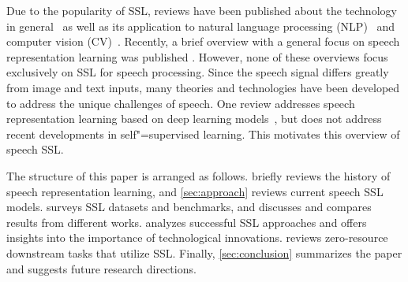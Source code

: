 Due to the popularity of SSL, reviews have been published about the
technology in general~\parencite{bommasani_opportunities_2021,ericsson_selfsupervised_2022,liu_selfsupervised_2021} as well as its application to natural language processing (NLP)~\parencite{rogers_primer_2020,liu_pretrain_2021,xia_which_2020,qiu_pretrained_2020} and computer vision (CV)~\parencite{jing_selfsupervised_2021}. Recently, a brief overview with a general focus on speech representation learning was published \parencite{borgholt_brief_2022}. 
However, none of these overviews focus exclusively on SSL for speech processing. Since the speech signal differs greatly from image and text inputs, many  theories  and technologies have been developed to address the unique challenges of speech. 
One review addresses speech representation learning based on deep learning models~\parencite{latif_deep_2021}, but does not address recent developments in self"=supervised learning. This motivates this overview of speech SSL.


The structure of this paper is arranged as follows. 
briefly reviews the history of speech representation learning, and
\cref{sec:approach} reviews current speech SSL models.
 surveys SSL datasets and benchmarks, 
and discusses and compares results from different works. 
analyzes successful SSL approaches and offers insights into the
importance of technological innovations.  reviews 
zero-resource downstream tasks that utilize SSL. 
Finally, \cref{sec:conclusion} summarizes the paper and suggests 
future research directions.


